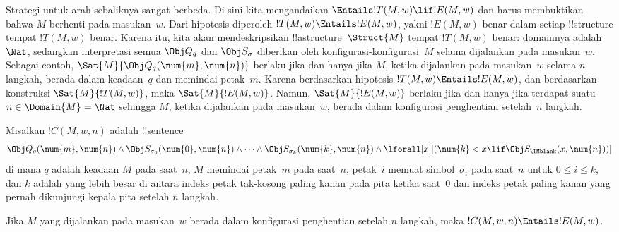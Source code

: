 \documentclass[../../../include/open-logic-section]{subfiles}
\begin{document}
\begin{explain}
Strategi untuk arah sebaliknya sangat berbeda. Di sini kita mengandaikan
$\Entails !T(M, w) \lif !E(M, w)$ dan harus membuktikan bahwa $M$ berhenti
pada masukan~$w$. Dari hipotesis diperoleh $!T(M, w) \Entails !E(M, w)$,
yakni $!E(M, w)$ benar dalam setiap !!{structure} tempat $!T(M, w)$ benar.
Karena itu, kita akan mendeskripsikan !!a{structure}~$\Struct{M}$ tempat
$!T(M, w)$ benar: domainnya adalah $\Nat$, sedangkan interpretasi semua
$\Obj Q_q$ dan $\Obj S_\sigma$ diberikan oleh konfigurasi-konfigurasi~$M$
selama dijalankan pada masukan~$w$. Sebagai contoh,
$\Sat{M}{\Obj Q_q(\num{m}, \num{n})}$ berlaku jika dan hanya jika $M$, ketika
dijalankan pada masukan~$w$ selama $n$ langkah, berada dalam keadaan~$q$ dan
memindai petak~$m$. Karena berdasarkan hipotesis
$!T(M, w) \Entails !E(M, w)$, dan berdasarkan konstruksi
$\Sat{M}{!T(M, w)}$, maka $\Sat{M}{!E(M, w)}$. Namun,
$\Sat{M}{!E(M, w)}$ berlaku jika dan hanya jika terdapat suatu
$n \in \Domain{M} = \Nat$ sehingga $M$, ketika dijalankan pada masukan~$w$,
berada dalam konfigurasi penghentian setelah~$n$ langkah.
\end{explain}

\begin{defn}
Misalkan $!C(M, w, n)$ adalah !!{sentence}
\[
\Obj Q_q(\num{m}, \num{n}) \land \Obj S_{\sigma_0}(\num{0}, \num{n})
\land \dots \land \Obj S_{\sigma_k}(\num{k}, \num{n}) \land
\lforall[x][(\num{k} < x \lif \Obj S_\TMblank(x, \num{n}))]
\]
di mana $q$ adalah keadaan $M$ pada saat~$n$, $M$ memindai petak~$m$ pada
saat~$n$, petak~$i$ memuat simbol~$\sigma_i$ pada saat~$n$ untuk
$0 \le i \le k$, dan $k$ adalah yang lebih besar di antara indeks petak
tak-kosong paling kanan pada pita ketika saat~$0$ dan indeks petak paling kanan
yang pernah dikunjungi kepala pita setelah $n$ langkah.
\end{defn}

\begin{lem}
Jika $M$ yang dijalankan pada masukan~$w$ berada dalam konfigurasi penghentian
setelah $n$ langkah, maka $!C(M, w, n) \Entails !E(M, w)$.
\end{lem}
\end{document}
